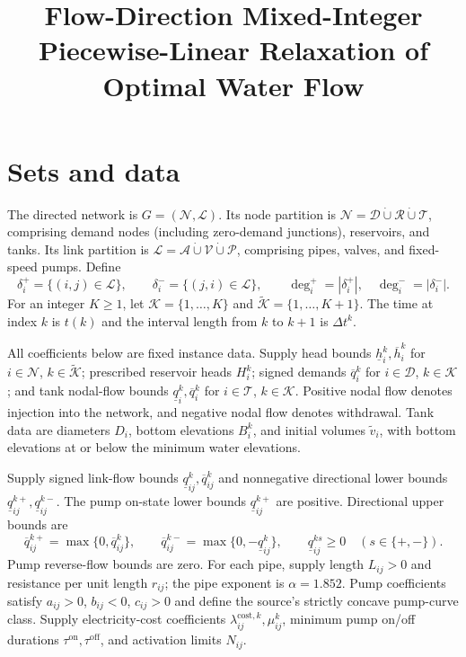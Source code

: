 \documentclass{article}
\begin{document}
\title{Flow-Direction Mixed-Integer Piecewise-Linear Relaxation of Optimal Water Flow}
\date{}
\maketitle

\section*{Sets and data}
The directed network is $G=(\mathcal N,\mathcal L)$. Its node partition is $\mathcal N=\mathcal D\mathbin{\dot\cup}\mathcal R\mathbin{\dot\cup}\mathcal T$, comprising demand nodes (including zero-demand junctions), reservoirs, and tanks. Its link partition is $\mathcal L=\mathcal A\mathbin{\dot\cup}\mathcal V\mathbin{\dot\cup}\mathcal P$, comprising pipes, valves, and fixed-speed pumps. Define
\[
\delta_i^+=\{(i,j)\in\mathcal L\},\qquad
\delta_i^-=\{(j,i)\in\mathcal L\},\qquad
\deg_i^+=|\delta_i^+|,\quad \deg_i^-=|\delta_i^-|.
\]
For an integer $K\ge1$, let $\mathcal K=\{1,\ldots,K\}$ and $\widetilde{\mathcal K}=\{1,\ldots,K+1\}$. The time at index $k$ is $t(k)$ and the interval length from $k$ to $k+1$ is $\Delta t^k$.

All coefficients below are fixed instance data. Supply head bounds $\underline h_i^k,\overline h_i^k$ for $i\in\mathcal N$, $k\in\widetilde{\mathcal K}$; prescribed reservoir heads $H_i^k$; signed demands $\overline q_i^k$ for $i\in\mathcal D$, $k\in\mathcal K$; and tank nodal-flow bounds $\underline q_i^k,\overline q_i^k$ for $i\in\mathcal T$, $k\in\mathcal K$. Positive nodal flow denotes injection into the network, and negative nodal flow denotes withdrawal. Tank data are diameters $D_i$, bottom elevations $B_i^k$, and initial volumes $\widetilde v_i$, with bottom elevations at or below the minimum water elevations.

Supply signed link-flow bounds $\underline q_{ij}^k,\overline q_{ij}^k$ and nonnegative directional lower bounds $\underline q_{ij}^{k+},\underline q_{ij}^{k-}$. The pump on-state lower bounds $\underline q_{ij}^{k+}$ are positive. Directional upper bounds are
\begin{equation}
\overline q_{ij}^{k+}=\max\{0,\overline q_{ij}^k\},\qquad
\overline q_{ij}^{k-}=\max\{0,-\underline q_{ij}^k\},\qquad
\underline q_{ij}^{ks}\ge0\quad(s\in\{+,-\}).
\tag{D1}
\end{equation}
Pump reverse-flow bounds are zero. For each pipe, supply length $L_{ij}>0$ and resistance per unit length $r_{ij}$; the pipe exponent is $\alpha=1.852$. Pump coefficients satisfy $a_{ij}>0$, $b_{ij}<0$, $c_{ij}>0$ and define the source's strictly concave pump-curve class. Supply electricity-cost coefficients $\lambda_{ij}^{\mathrm{cost},k},\mu_{ij}^k$, minimum pump on/off durations $\tau^{\mathrm{on}},\tau^{\mathrm{off}}$, and activation limits $N_{ij}$.
\end{document}
